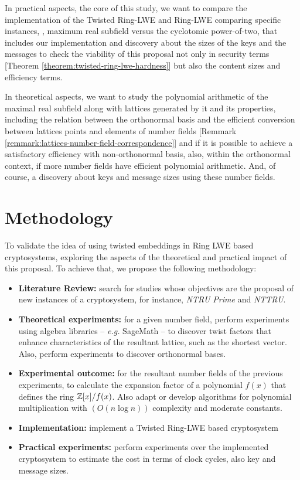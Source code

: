 \documentclass[a4paper,12pt]{article}
\begin{document}
In practical aspects, the core of this study, we want to compare the implementation of the Twisted Ring-LWE and Ring-LWE comparing specific instances, \ie, maximum real subfield versus the cyclotomic power-of-two, that includes our implementation and discovery about the sizes of the keys and the messages to check the viability of this proposal not only in security terms [Theorem \ref{theorem:twisted-ring-lwe-hardness}] but also the content sizes and efficiency terms.

In theoretical aspects, we want to study the polynomial arithmetic of the maximal real subfield along with lattices generated by it and its properties, including the relation between the orthonormal basis and the efficient conversion between lattices points and elements of number fields [Remmark \ref{remmark:lattices-number-field-correspondence}] and if it is possible to achieve a satisfactory efficiency with non-orthonormal basis, also, within the orthonormal context, if more number fields have efficient polynomial arithmetic. And, of course, a discovery about keys and message sizes using these number fields.

\section{Methodology}
\label{methodology}
To validate the idea of using twisted embeddings in Ring LWE based cryptosystems, exploring the aspects of the theoretical and practical impact of this proposal. To achieve that, we propose the following methodology:
\begin{itemize}
\item \textbf{Literature Review:} search for studies whose objectives are the proposal of new instances of a cryptosystem, for instance, \emph{NTRU Prime} and \emph{NTTRU}.
\item \textbf{Theoretical experiments:} for a given number field, perform experiments using algebra libraries -- \emph{e.g.} SageMath -- to discover twist factors that enhance characteristics of the resultant lattice, such as the shortest vector. Also, perform experiments to discover orthonormal bases.
\item \textbf{Experimental outcome:} for the resultant number fields of the previous experiments, to calculate the expansion factor of a polynomial \(f(x)\) that defines the ring \(\mathbb{Z}[x]/f(x)\). Also adapt or develop algorithms for polynomial multiplication with \((O(n\log{n}))\) complexity and moderate constants.
\item \textbf{Implementation:} implement a Twisted Ring-LWE based cryptosystem
\item \textbf{Practical experiments:} perform experiments over the implemented cryptosystem to estimate the cost in terms of clock cycles, also key and message sizes.
\end{itemize}
\end{document}
